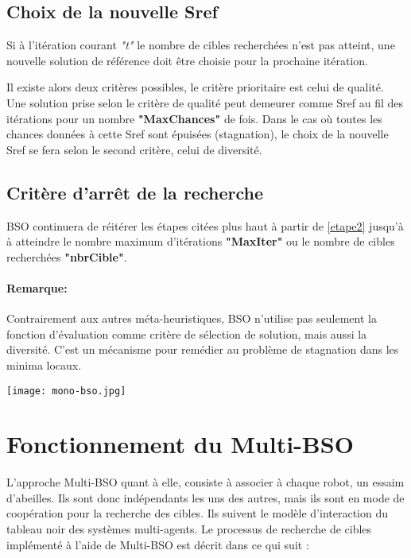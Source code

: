 \subsection{Choix de la nouvelle Sref}
Si à l'itération courant \textit{"t"} le nombre de cibles recherchées n'est pas atteint, une nouvelle solution de référence doit être choisie pour la prochaine itération.
 
Il existe alors deux critères possibles, le critère prioritaire est celui de qualité. 
Une solution prise selon le critère de qualité peut demeurer comme Sref au fil des itérations pour un nombre \textbf{"MaxChances"} de fois.
Dans le cas où toutes les chances données à cette Sref sont épuisées (stagnation), le choix de la nouvelle Sref se fera selon le second critère, celui de diversité.



\subsection{Critère d'arrêt de la recherche}
BSO continuera de réitérer les étapes citées plus haut à partir de \ref{etape2} jusqu'à à atteindre le nombre maximum d'itérations \textbf{"MaxIter"} ou le nombre de cibles recherchées \textbf{"nbrCible"}.



\paragraph{Remarque:}
Contrairement aux autres méta-heuristiques, BSO n'utilise pas seulement la fonction d'évaluation comme critère de sélection de solution, mais aussi la diversité. C'est un mécanisme pour remédier au problème de stagnation dans les minima locaux.



\noindent
\begin{center}
	\captionsetup{width=1\linewidth}
	\texttt{[image: mono-bso.jpg]}%
	\vspace{-0.1 cm}
	\label{monoBSO}%
\end{center}

\newpage

\section{Fonctionnement du Multi-BSO}
L’approche Multi-BSO quant à elle, consiste à associer à chaque robot, un essaim d’abeilles. Ils sont donc indépendants les uns des autres, mais ils sont en mode de coopération pour la recherche des cibles. Ils suivent le modèle d’interaction du tableau noir des systèmes multi-agents. Le processus de recherche de cibles implémenté à l’aide de Multi-BSO est décrit dans ce qui suit :

